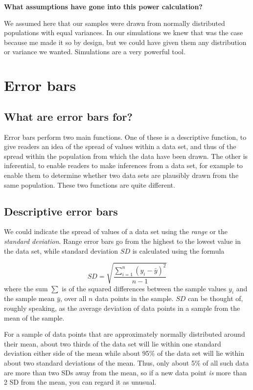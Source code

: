 \documentclass[
  letterpaper,
  DIV=11,
  numbers=noendperiod]{scrreprt}
\begin{document}
\textbf{What assumptions have gone into this power calculation?}

We assumed here that our samples were drawn from normally distributed
populations with equal variances. In our simulations we knew that was
the case because me made it so by design, but we could have given them
any distribution or variance we wanted. Simulations are a very powerful
tool.

\chapter{Error bars}\label{error-bars}

\section{What are error bars for?}\label{what-are-error-bars-for}

Error bars perform two main functions. One of these is a descriptive
function, to give readers an idea of the spread of values within a data
set, and thus of the spread within the population from which the data
have been drawn. The other is inferential, to enable readers to make
inferences from a data set, for example to enable them to determine
whether two data sets are plausibly drawn from the same population.
These two functions are quite different.

\section{Descriptive error bars}\label{descriptive-error-bars}

We could indicate the spread of values of a data set using the
\emph{range} or the \emph{standard deviation}. Range error bars go from
the highest to the lowest value in the data set, while standard
deviation \(SD\) is calculated using the formula

\[
SD=\sqrt{\frac{\sum_{i=1}^n\left(y_i-\bar{y}\right)^2}{n-1}}
\] where the sum \(\sum\) is of the squared differences between the
sample values \(y_i\) and the sample mean \(\bar{y}\), over all \(n\)
data points in the sample. \(SD\) can be thought of, roughly speaking,
as the average deviation of data points in a sample from the mean of the
sample.

For a sample of data points that are approximately normally distributed
around their mean, about two thirds of the data set will lie within one
standard deviation either side of the mean while about 95\% of the data
set will lie within about two standard deviations of the mean. Thus,
only about 5\% of all such data are more than two SDs away from the
mean, so if a new data point \emph{is} more than 2 SD from the mean, you
can regard it as unusual.
\end{document}
